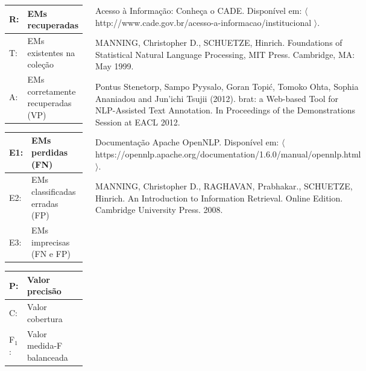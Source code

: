 \documentclass[25pt, a2papper, portrait]{tikzposter}
\begin{document}
\begin{columns}
{      \begin{center}
      \begin{tabular}{| l | l |}
        \arrayrulecolor{white}\hline
        R: & EMs recuperadas \\ \hline
        T: & EMs existentes na coleção \\ \hline
        A: & EMs corretamente recuperadas (VP) \\ \hline
      \end{tabular}
      \begin{tabular}{| l | l |}
        \arrayrulecolor{white}\hline
        E1: & EMs perdidas (FN) \\ \hline
        E2: & EMs classificadas erradas (FP) \\ \hline
        E3: & EMs imprecisas (FN e FP) \\ \hline
      \end{tabular}
      \begin{tabular}{| l | l |}
        \arrayrulecolor{white}\hline
        P: & Valor precisão \\ \hline
        C: & Valor cobertura \\ \hline
        F$_1$: & Valor medida-F balanceada \\ \hline
      \end{tabular}
      \end{center}
    }

    {
      \begin{enumerate}[label={[\arabic*]}]
      \item Acesso à Informação: Conheça o CADE. Disponível em: $\langle$ http://www.cade.gov.br/acesso-a-informacao/institucional $\rangle$.
      \item MANNING, Christopher D., SCHUETZE, Hinrich. Foundations of Statistical Natural Language Processing, MIT Press. Cambridge, MA: May 1999.
      \item Pontus Stenetorp, Sampo Pyysalo, Goran Topić, Tomoko Ohta, Sophia Ananiadou and Jun'ichi Tsujii (2012). brat: a Web-based Tool for NLP-Assisted Text Annotation. In Proceedings of the Demonstrations Session at EACL 2012.
      \item Documentação Apache OpenNLP. Disponível em: $\langle$ https://opennlp.apache.org/documentation/1.6.0/manual/\newline opennlp.html $\rangle$.
      \item MANNING, Christopher D., RAGHAVAN, Prabhakar., SCHUETZE, Hinrich. An Introduction to Information Retrieval. Online Edition. Cambridge University Press. 2008.
      \end{enumerate}

      \vspace*{-0.25cm}
    }
\end{columns}
\end{document}
